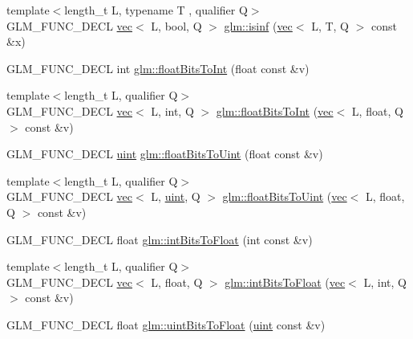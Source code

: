 \begin{DoxyCompactItemize}
\item 
{\footnotesize template$<$length\+\_\+t L, typename T , qualifier Q$>$ }\\G\+L\+M\+\_\+\+F\+U\+N\+C\+\_\+\+D\+E\+CL \hyperlink{structglm_1_1vec}{vec}$<$ L, bool, Q $>$ \hyperlink{group__core__func__common_ga2885587c23a106301f20443896365b62}{glm\+::isinf} (\hyperlink{structglm_1_1vec}{vec}$<$ L, T, Q $>$ const \&x)
\item 
G\+L\+M\+\_\+\+F\+U\+N\+C\+\_\+\+D\+E\+CL int \hyperlink{group__core__func__common_gadc6a536a7bef046c3293d2ccad6d9ca2}{glm\+::float\+Bits\+To\+Int} (float const \&v)
\item 
{\footnotesize template$<$length\+\_\+t L, qualifier Q$>$ }\\G\+L\+M\+\_\+\+F\+U\+N\+C\+\_\+\+D\+E\+CL \hyperlink{structglm_1_1vec}{vec}$<$ L, int, Q $>$ \hyperlink{group__core__func__common_ga99f7d62f78ac5ea3b49bae715c9488ed}{glm\+::float\+Bits\+To\+Int} (\hyperlink{structglm_1_1vec}{vec}$<$ L, float, Q $>$ const \&v)
\item 
G\+L\+M\+\_\+\+F\+U\+N\+C\+\_\+\+D\+E\+CL \hyperlink{group__core__precision_ga4fd29415871152bfb5abd588334147c8}{uint} \hyperlink{group__core__func__common_ga748b4d2819b48d28ca09dc8733488873}{glm\+::float\+Bits\+To\+Uint} (float const \&v)
\item 
{\footnotesize template$<$length\+\_\+t L, qualifier Q$>$ }\\G\+L\+M\+\_\+\+F\+U\+N\+C\+\_\+\+D\+E\+CL \hyperlink{structglm_1_1vec}{vec}$<$ L, \hyperlink{group__core__precision_ga4fd29415871152bfb5abd588334147c8}{uint}, Q $>$ \hyperlink{group__core__func__common_ga49418ba4c8a60fbbb5d57b705f3e26db}{glm\+::float\+Bits\+To\+Uint} (\hyperlink{structglm_1_1vec}{vec}$<$ L, float, Q $>$ const \&v)
\item 
G\+L\+M\+\_\+\+F\+U\+N\+C\+\_\+\+D\+E\+CL float \hyperlink{group__core__func__common_ga2650dc57b2148a6ffbce20944fb4d97a}{glm\+::int\+Bits\+To\+Float} (int const \&v)
\item 
{\footnotesize template$<$length\+\_\+t L, qualifier Q$>$ }\\G\+L\+M\+\_\+\+F\+U\+N\+C\+\_\+\+D\+E\+CL \hyperlink{structglm_1_1vec}{vec}$<$ L, float, Q $>$ \hyperlink{group__core__func__common_ga7a0a8291a1cf3e1c2aee33030a1bd7b0}{glm\+::int\+Bits\+To\+Float} (\hyperlink{structglm_1_1vec}{vec}$<$ L, int, Q $>$ const \&v)
\item 
G\+L\+M\+\_\+\+F\+U\+N\+C\+\_\+\+D\+E\+CL float \hyperlink{group__core__func__common_ga97464ca9ff4267de30ea408f700d4ca8}{glm\+::uint\+Bits\+To\+Float} (\hyperlink{group__core__precision_ga4fd29415871152bfb5abd588334147c8}{uint} const \&v)

\end{DoxyCompactItemize}
